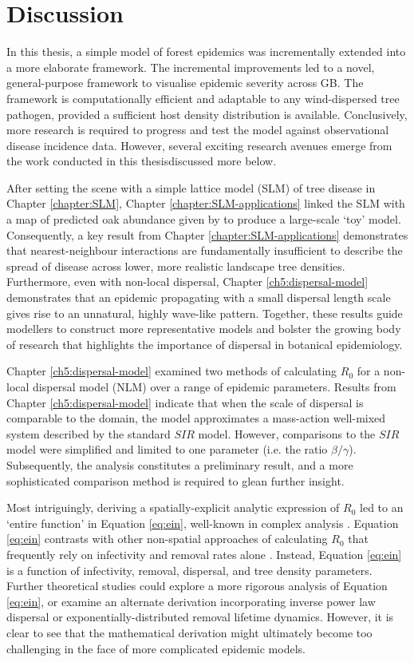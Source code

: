 
\chapter{Discussion}

In this thesis, a simple model of forest epidemics was incrementally extended into a more elaborate framework.
The incremental improvements led to a novel, general-purpose framework to visualise epidemic severity across GB.
The framework is computationally efficient and adaptable to any wind-dispersed tree pathogen, provided a sufficient host density distribution is available. Conclusively, more research is required to progress and test the model against observational disease incidence data.
However, several exciting research avenues emerge from the work conducted in this thesis\textemdash discussed more below.

After setting the scene with a simple lattice model (SLM) of tree disease in Chapter \ref{chapter:SLM}, 
Chapter \ref{chapter:SLM-applications} linked the SLM with a map of predicted oak abundance given by \cite{hill.data} to produce a large-scale `toy' model. Consequently, a key result from Chapter \ref{chapter:SLM-applications} demonstrates that nearest-neighbour interactions are
fundamentally insufficient to describe the spread of disease across lower, more realistic landscape tree densities. 
Furthermore, even with non-local dispersal, Chapter \ref{ch5:dispersal-model} demonstrates that an epidemic propagating with a small dispersal length scale gives rise to an unnatural, highly wave-like pattern. Together, these results guide modellers to construct more representative models and bolster the growing body of research that highlights the importance of dispersal in botanical epidemiology.

Chapter \ref{ch5:dispersal-model} examined two methods of calculating $R_0$ for a non-local dispersal model (NLM) over a range of epidemic parameters. Results from Chapter \ref{ch5:dispersal-model} indicate that when the scale of dispersal is comparable to the domain, the model approximates a mass-action well-mixed system described by the standard $SIR$ model. However, comparisons to the $SIR$ model were simplified and limited to one parameter (i.e. the ratio $\beta/\gamma$). Subsequently, the analysis constitutes a preliminary result, and a more sophisticated comparison method is required to glean further insight.

Most intriguingly, deriving a spatially-explicit analytic expression of $R_0$ led to an `entire function' in Equation \ref{eq:ein}, well-known in complex analysis \cite{abramowitz1948handbook}. 
Equation \ref{eq:ein} contrasts with other non-spatial approaches of calculating $R_0$ that frequently rely on infectivity and removal rates alone \cite{...}. Instead, Equation \ref{eq:ein} is a function of infectivity, removal, dispersal, and tree density parameters. Further theoretical studies could explore a more rigorous analysis of Equation \ref{eq:ein}, or examine an alternate derivation incorporating inverse power law dispersal or exponentially-distributed removal lifetime dynamics.
However, it is clear to see that the mathematical derivation might ultimately become too challenging in the face of more complicated epidemic models. 

